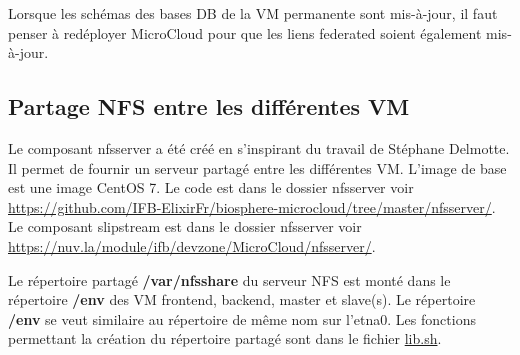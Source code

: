 \begin{mycolorbox}
	Lorsque les schémas des bases DB de la VM permanente sont mis-à-jour, il faut penser à redéployer MicroCloud pour que les liens federated soient également mis-à-jour.
\end{mycolorbox}

\subsection{Partage NFS entre les différentes VM}

\label{nfsserver} Le composant nfsserver a été créé en s'inspirant du travail de Stéphane Delmotte.
Il permet de fournir un serveur partagé entre les différentes VM.
L'image de base est une image CentOS 7.
Le code est dans le dossier nfsserver voir  \url{https://github.com/IFB-ElixirFr/biosphere-microcloud/tree/master/nfsserver/}.
Le composant slipstream est dans le dossier nfsserver voir
\url{https://nuv.la/module/ifb/devzone/MicroCloud/nfsserver/}.

Le répertoire partagé \textbf{/var/nfsshare} du serveur NFS est monté dans le répertoire \textbf{/env}
des VM frontend, backend, master et slave(s).
Le répertoire \textbf{/env} se veut similaire au répertoire de même nom sur l’etna0. 
Les fonctions permettant la création du répertoire partagé sont dans le fichier \href{https://github.com/IFB-ElixirFr/biosphere-microcloud/blob/master/lib.sh}{lib.sh}.
